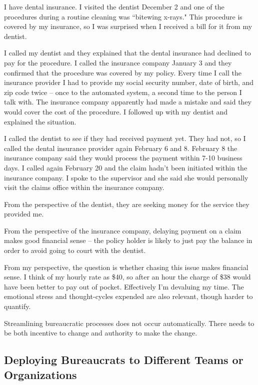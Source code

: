 
I have dental insurance. I visited the dentist December 2 and one of the procedures during a routine cleaning was ``bitewing x-rays." This procedure is covered by my insurance, so I was surprised when I received a bill for it from my dentist.

I called my dentist and they explained that the dental insurance had declined to pay for the procedure. I called the insurance company January 3 and they confirmed that the procedure was covered by my policy. 
Every time I call the insurance provider I had to provide my social security number, date of birth, and zip code twice -- once to the automated system, a second time to the person I talk with. The insurance company apparently had made a mistake and said they would cover the cost of the procedure. I followed up with my dentist and explained the situation.

I called the dentist to see if they had received payment yet. They had not, so I called the dental insurance provider again February 6 and 8. February 8 the insurance company said they would process the payment within 7-10 business days. I called again February 20 and the claim hadn't been initiated within the insurance company. I spoke to the supervisor and she said she would personally visit the claims office within the insurance company.

From the perspective of the dentist, they are seeking money for the service they provided me.

From the perspective of the insurance company, delaying payment on a claim makes good financial sense -- the policy holder is likely to just pay the balance in order to avoid going to court with the dentist.

From my perspective, the question is whether chasing this issue makes financial sense. I think of my hourly rate as \$40, so after an hour the charge of \$38 would have been better to pay out of pocket. Effectively I'm devaluing my time. The emotional stress and thought-cycles expended are also relevant, though harder to quantify.

Streamlining bureaucratic processes does not occur automatically. There needs to be both incentive to change and authority to make the change. 

\subsection*{Deploying Bureaucrats to Different Teams or Organizations\label{sec:prisoner_exchange}}

